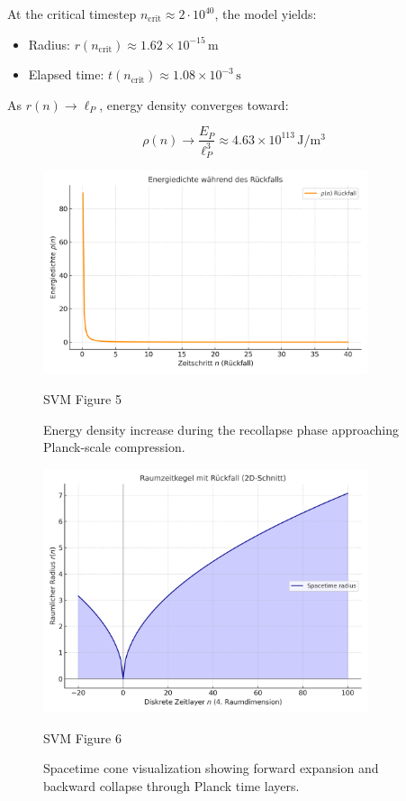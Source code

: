 \documentclass[11pt]{article}
\begin{document}
At the critical timestep $n_{\mathrm{crit}} \approx 2 \cdot 10^{40}$, the model yields:

\begin{itemize}
  \item Radius: $r(n_{\mathrm{crit}}) \approx 1.62 \times 10^{-15} \, \mathrm{m}$
  \item Elapsed time: $t(n_{\mathrm{crit}}) \approx 1.08 \times 10^{-3} \, \mathrm{s}$
\end{itemize}

As $r(n) \rightarrow \ell_P$, energy density converges toward:

\begin{equation*}
\rho(n) \rightarrow \frac{E_P}{\ell_P^3} \approx 4.63 \times 10^{113} \, \mathrm{J/m^3}
\end{equation*}

\begin{figure}[ht]
\centering
\includegraphics[width=0.85\textwidth]{figures/SVM_Energy_Density_Recollapse.png}
\caption{SVM Figure 5}
\label{fig:svm_5}
\caption{Energy density increase during the recollapse phase approaching Planck-scale compression.}\label{fig:energydensity}
\end{figure}

\begin{figure}[ht]
\centering
\includegraphics[width=0.85\textwidth]{figures/SVM_Spacetime_Cone_With_Recollapse.png}
\caption{SVM Figure 6}
\label{fig:svm_6}
\caption{Spacetime cone visualization showing forward expansion and backward collapse through Planck time layers.}\label{fig:spacetimecone}
\end{figure}
\end{document}
